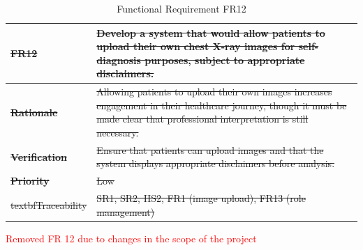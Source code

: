 \documentclass[12pt]{article}
\begin{document}
\begin{table}[h!]
\centering
{}
\begin{tabular}{|p{3.5cm}|p{11.5cm}|}
\hline
\rowcolor{gray!30}
\sout{\textbf{FR12}} & \sout{Develop a system that would allow patients to upload their own chest X-ray images for self-diagnosis purposes, subject to appropriate disclaimers.} \\
\hline
\sout{\textbf{Rationale}} & \sout{Allowing patients to upload their own images increases engagement in their healthcare journey, though it must be made clear that professional interpretation is still necessary.} \\
\hline
\sout{\textbf{Verification}} & \sout{Ensure that patients can upload images and that the system displays appropriate disclaimers before analysis.} \\
\hline
\sout{\textbf{Priority}} & \sout{Low} \\
\hline
\sout{textbf{Traceability}} & \sout{SR1, SR2, HS2, FR1 (image upload), FR13 (role management)} \\
\hline
\end{tabular}
\caption{Functional Requirement FR12}
\textcolor{red}{Removed FR 12 due to changes in the scope of the project}
\end{table}
\end{document}
